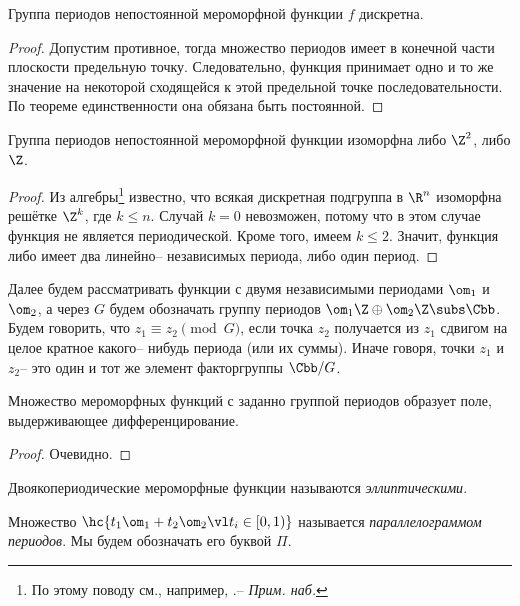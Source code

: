 \documentclass[a4paper]{article}
\begin{document}
\begin{lemma}
Группа периодов непостоянной мероморфной функции $f$ дискретна.
\end{lemma}
\begin{proof}
Допустим противное, тогда множество периодов имеет в конечной части плоскости предельную точку.
Следовательно, функция принимает одно и то же значение на некоторой сходящейся к этой предельной
точке последовательности. По теореме единственности она обязана быть постоянной.
\end{proof}

\begin{imp}
Группа периодов непостоянной мероморфной функции изоморфна либо $\Z^2$, либо $\Z$.
\end{imp}
\begin{proof}
Из алгебры\footnote{По этому поводу см., например,
\cite[гл.\,9,~\S\,1,~теорема\,4]{vinberg}.-- \emph{Прим. наб.}} известно, что всякая дискретная
подгруппа в $\R^n$ изоморфна решётке $\Z^k$, где $k \le n$.
Случай $k = 0$ невозможен, потому что в этом случае функция не является периодической.
Кроме того, имеем $k \le 2$. Значит, функция либо имеет два линейно-- независимых периода,
либо один период.
\end{proof}

Далее будем рассматривать функции с двумя независимыми периодами $\om_1$ и $\om_2$, а
через $G$ будем обозначать группу периодов $\om_1\Z \oplus \om_2\Z \subs \Cbb$.
Будем говорить, что $z_1 \equiv z_2 \pmod G$, если точка $z_2$ получается из $z_1$ сдвигом на
целое кратное какого-- нибудь периода (или их суммы). Иначе говоря, точки $z_1$ и $z_2$-- это один
и тот же элемент факторгруппы $\Cbb/G$.

\begin{stm}
Множество мероморфных функций с заданно группой периодов образует поле, выдерживающее
дифференцирование.
\end{stm}
\begin{proof}
Очевидно.
\end{proof}

\begin{df}
Двоякопериодические мероморфные функции называются \emph{эллиптическими}.
\end{df}

\begin{df}
Множество $\hc{t_1\om_1 + t_2\om_2 \vl t_i \in [0,1)}$ называется \emph{параллелограммом периодов}.
Мы будем обозначать его буквой $\Pi$.
\end{df}
\end{document}
